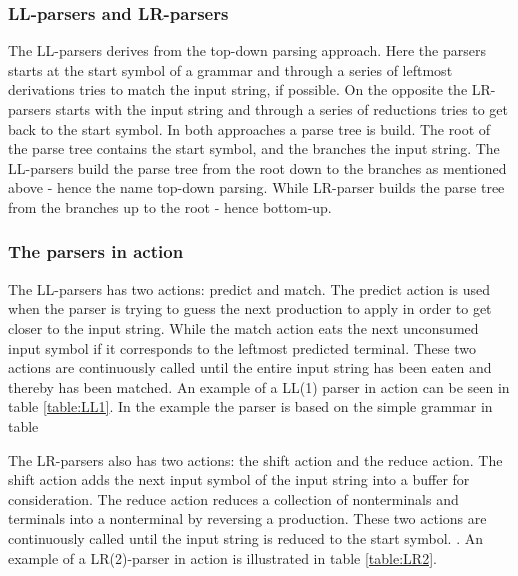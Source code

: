 \subsubsection{LL-parsers and LR-parsers}

The LL-parsers derives from the top-down parsing approach. Here the parsers starts at the start symbol of a grammar and through a series of leftmost derivations tries to match the input string, if possible. On the opposite the LR-parsers starts with the input string and through a series of reductions tries to get back to the start symbol. In both approaches a parse tree is build. The root of the parse tree contains the start symbol, and the branches the input string. The LL-parsers build the parse tree from the root down to the branches as mentioned above - hence the name top-down parsing. While LR-parser builds the parse tree from the branches up to the root - hence bottom-up.

\subsubsection{The parsers in action} 
The LL-parsers has two actions: predict and match. The predict action is used when the parser is trying to guess the next production to apply in order to get closer to the input string. While the match action eats the next unconsumed input symbol if it corresponds to the leftmost predicted terminal. These two actions are continuously called until the entire input string has been eaten and thereby has been matched. An example of a LL(1) parser in action can be seen in table \ref{table:LL1}. In the example the parser is based on the simple grammar in table 

\begin{centering}
\begin{ebnf}
\end{ebnf}
\end{centering}
The LR-parsers also has two actions: the shift action and the reduce action. The shift action adds the next input symbol of the input string into a buffer for consideration. The reduce action reduces a collection of nonterminals and terminals into a nonterminal by reversing a production. These two actions are
continuously called until the input string is reduced to the start symbol. \cite{LL(1)andLR(2)inaction}. An example of a LR(2)-parser in action is illustrated in table \ref{table:LR2}.

